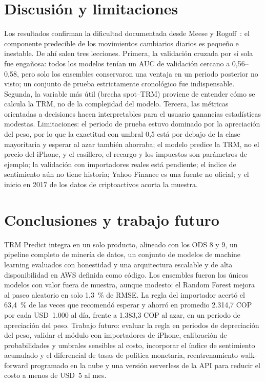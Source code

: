 \documentclass[conference]{IEEEtran}
\begin{document}
\section{Discusión y limitaciones}
\label{sec:disc}
Los resultados confirman la dificultad documentada desde Meese y Rogoff~\cite{meese1983}: el componente predecible de los movimientos cambiarios diarios es pequeño e inestable. De ahí salen tres lecciones. Primera, la validación cruzada por sí sola fue engañosa: todos los modelos tenían un AUC de validación cercano a 0,56--0,58, pero solo los ensembles conservaron una ventaja en un periodo posterior no visto; un conjunto de prueba estrictamente cronológico fue indispensable. Segunda, la variable más útil (brecha spot--TRM) proviene de entender cómo se calcula la TRM, no de la complejidad del modelo. Tercera, las métricas orientadas a decisiones hacen interpretables para el usuario ganancias estadísticas modestas. Limitaciones: el periodo de prueba estuvo dominado por la apreciación del peso, por lo que la exactitud con umbral 0,5 está por debajo de la clase mayoritaria y esperar al azar también ahorraba; el modelo predice la TRM, no el precio del iPhone, y el casillero, el recargo y los impuestos son parámetros de ejemplo; la validación con importadores reales está pendiente; el índice de sentimiento aún no tiene historia; Yahoo Finance es una fuente no oficial; y el inicio en 2017 de los datos de criptoactivos acorta la muestra.

\section{Conclusiones y trabajo futuro}
TRM Predict integra en un solo producto, alineado con los ODS 8 y 9, un pipeline completo de minería de datos, un conjunto de modelos de machine learning evaluados con honestidad y una arquitectura escalable y de alta disponibilidad en AWS definida como código. Los ensembles fueron los únicos modelos con valor fuera de muestra, aunque modesto: el Random Forest mejora al paseo aleatorio en solo 1,3~\% de RMSE. La regla del importador acertó el 63,4~\% de las veces que recomendó esperar y ahorró en promedio 2.314,7 COP por cada USD~1.000 al día, frente a 1.383,3 COP al azar, en un periodo de apreciación del peso. Trabajo futuro: evaluar la regla en periodos de depreciación del peso, validar el módulo con importadores de iPhone, calibración de probabilidades y umbrales sensibles al costo, incorporar el índice de sentimiento acumulado y el diferencial de tasas de política monetaria, reentrenamiento walk-forward programado en la nube y una versión serverless de la API para reducir el costo a menos de USD~5 al mes.
\end{document}
